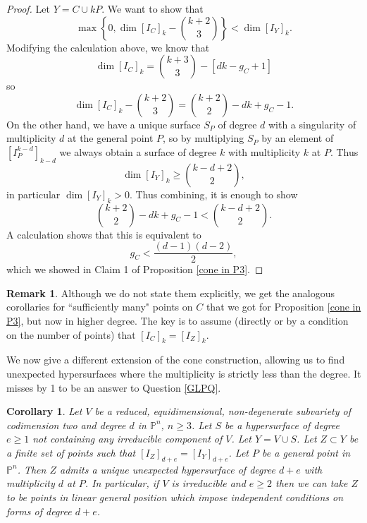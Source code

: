 \documentclass[12pt]{amsart}
\numberwithin{equation}{section}
\newtheorem{corollary}[theorem]{Corollary}
\theoremstyle{definition}
\newtheorem{remark}[theorem]{Remark}
\newcommand{\PP}{ \ensuremath{\mathbb{P}}}
\begin{document}
\begin{proof}
Let $Y = C \cup kP$. We want to show that 
\begin{equation} \label{to show}
  \max \left\{ 0 , \dim[I_C]_k - \binom{k+2}{3} \right\} < \dim [I_Y]_k. 
\end{equation}
Modifying the calculation above, we know that
\[
\dim [I_C]_k = \binom{k+3}{3} - [dk - g_C + 1]
\]
so
\[
\dim [I_C]_k - \binom{k+2}{3} = \binom{k+2}{2} - dk + g_C -1.
\]
On the other hand, we have a unique surface $S_P$ of degree $d$ with a singularity of multiplicity $d$ at the general point $P$, so 
by multiplying $S_P$ by an element of $[I_P^{k-d}]_{k-d}$ we always obtain a surface of degree $k$ with  multiplicity $k$ at $P$. Thus
\[
\dim [I_Y]_k \geq \binom{k-d+2}{2},
\]
in particular $\dim [I_Y]_k > 0$. 
Thus combining, it is enough to show
\[
\binom{k+2}{2} - dk + g_C -1 < \binom{k-d+2}{2}.
\]
A calculation shows that this is equivalent to 
\[
g_C < \frac{(d-1)(d-2)}{2},
\]
which we showed in Claim 1 of Proposition \ref{cone in P3}.
\end{proof}

\begin{remark}
Although we do not state them explicitly, we get the analogous corollaries for ``sufficiently many" points on $C$ that we got for 
Proposition \ref{cone in P3}, but now in higher degree. The key is to assume (directly or by a condition on the number of points) that $[I_C]_k = [I_Z]_k$.
\end{remark}

We now give a different extension of the cone construction, allowing us to find unexpected hypersurfaces where the multiplicity is strictly 
less than the degree. It misses by 1 to be an answer to Question \ref{GLPQ}.  

\begin{corollary} \label{add S}
Let $V$ be a reduced, equidimensional, non-degenerate subvariety of codimension two and degree $d$ in $\PP^n$, $n \geq 3$. Let $S$ be a hypersurface of degree $e \geq 1$
not containing any irreducible component of $V$. Let $Y = V \cup S$. Let $Z \subset Y$ be a finite set of 
points such that $[I_Z]_{d+e} = [I_Y]_{d+e}$. Let $P$ be a general point in $\PP^n$. Then $Z$ admits a unique unexpected 
hypersurface of degree $d+e$ with multiplicity $d$ at $P$. In particular, if $V$ is irreducible and $e \geq 2$ then we can take $Z$ 
to be points in linear general position which impose independent conditions on forms of degree $d+e$.
\end{corollary}
\end{document}
